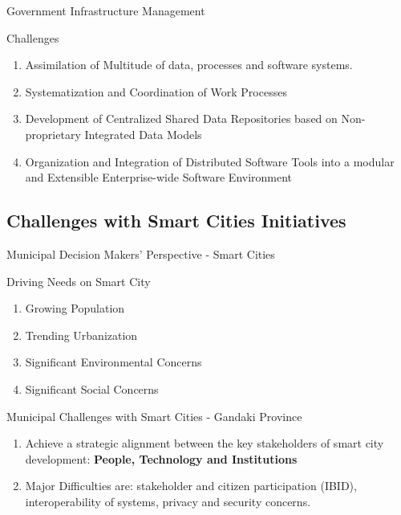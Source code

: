 \begin{frame}{Government Infrastructure Management}
    \begin{exampleblock}{Challenges}
        \begin{enumerate}
            \item Assimilation of Multitude of data, processes and software systems.
            \item Systematization and Coordination of Work Processes
            \item Development of Centralized Shared Data Repositories based on Non-proprietary Integrated Data Models
            \item Organization and Integration of Distributed Software Tools into a modular and Extensible Enterprise-wide Software Environment
        \end{enumerate}
        
    \end{exampleblock}
\end{frame}


\subsection{Challenges with Smart Cities Initiatives}

\begin{frame}{Municipal Decision Makers' Perspective - Smart Cities}
\begin{exampleblock}{Driving Needs on Smart City}
    \begin{enumerate}
        \item Growing Population
        \item Trending Urbanization
        \item Significant Environmental Concerns
        \item Significant Social Concerns
    \end{enumerate}
\end{exampleblock}

\begin{alertblock}{Municipal Challenges with Smart Cities - Gandaki Province}
    \begin{enumerate}
        \item Achieve a strategic alignment between the key stakeholders of smart city development: \textbf{People, Technology and Institutions}
        \item Major Difficulties are: stakeholder and citizen participation (IBID), interoperability of systems, privacy and security concerns.
    \end{enumerate}
\end{alertblock}
    
\end{frame}

